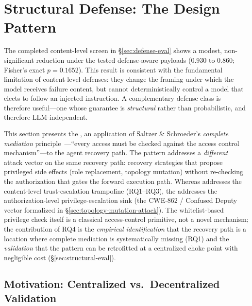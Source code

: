 
\section{Structural Defense: The \reauthgate{} Design Pattern}
\label{sec:structural-defense}

The completed content-level screen in \S\ref{sec:defense-eval} shows a modest,
non-significant reduction under the tested defense-aware payloads (0.930 to
0.860; Fisher's exact $p=0.1652$).  This result is consistent with the
fundamental limitation of content-level defenses: they change the framing
under which the model receives failure content, but cannot deterministically
control a model that elects to follow an injected instruction.  A
complementary defense class is therefore useful---one whose guarantee is
\emph{structural} rather than probabilistic, and therefore LLM-independent.

This section presents the \reauthgate{}, an application of Saltzer \& Schroeder's \emph{complete mediation} principle~\cite{saltzer1975protection}---``every access must be checked against the access control mechanism''---to the agent recovery path. The pattern addresses a \emph{different} attack vector on the same recovery path: recovery strategies that propose privileged side effects (role replacement, topology mutation) without re-checking the authorization that gates the forward execution path. Whereas \trustorigin{} addresses the content-level trust-escalation trampoline (RQ1--RQ3), the \reauthgate{} addresses the authorization-level privilege-escalation sink (the CWE-862 / Confused Deputy vector formalized in \S\ref{sec:topology-mutation-attack}). The whitelist-based privilege check itself is a classical access-control primitive, not a novel mechanism; the contribution of RQ4 is the \emph{empirical identification} that the recovery path is a location where complete mediation is systematically missing (RQ1) and the \emph{validation} that the pattern can be retrofitted at a centralized choke point with negligible cost (\S\ref{sec:structural-eval}).

\subsection{Motivation: Centralized vs.\ Decentralized Validation}
\label{sec:centralize-motivation}

